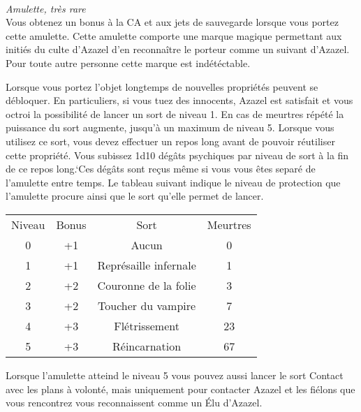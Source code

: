 \\
{\small \it Amulette, très rare}\\
\label{AmuletteAzazel}
Vous obtenez un bonus à la CA et aux jets de sauvegarde lorsque vous 
portez cette amulette. Cette amulette comporte une marque magique permettant
aux initiés du culte d'Azazel d'en reconnaître le porteur comme un suivant
d'Azazel. Pour toute autre personne cette marque est indétéctable.

Lorsque vous portez l'objet longtemps de nouvelles propriétés peuvent se 
débloquer. En particuliers, si vous tuez des innocents, Azazel est satisfait 
et vous octroi la possibilité de lancer un sort de niveau 1. En cas de meurtres 
répété la puissance du sort augmente, jusqu'à un maximum de niveau 5.
Lorsque vous utilisez ce sort, vous devez effectuer un repos long avant de
pouvoir réutiliser cette propriété. Vous subissez 1d10 dégâts psychiques par niveau de sort à
la fin de ce repos long.`Ces dégâts sont 
reçus même si vous vous êtes separé de l'amulette entre temps.
Le tableau suivant indique le niveau de protection que l'amulette procure ainsi que
le sort qu'elle permet de lancer.

\begin{center}
\setlength{\tabcolsep}{4pt}
\begin{tabular}{cccc}
Niveau & Bonus & Sort & Meurtres \\
   \rowcolor{LightCyan}
 0 & +1 & Aucun & 0  \\
 1 & +1 & Représaille infernale & 1 \\
   \rowcolor{LightCyan}
 2 & +2 & Couronne de la folie & 3 \\
 3 & +2 & Toucher du vampire & 7 \\
   \rowcolor{LightCyan}
 4 & +3 & Flétrissement & 23 \\
 5 & +3 & Réincarnation & 67 \\
\end{tabular}
\end{center}

Lorsque l'amulette atteind le niveau 5 vous pouvez aussi lancer le sort Contact avec 
les plans à volonté, mais uniquement pour contacter Azazel et les fiélons 
que vous rencontrez vous reconnaissent comme un Élu d'Azazel.
